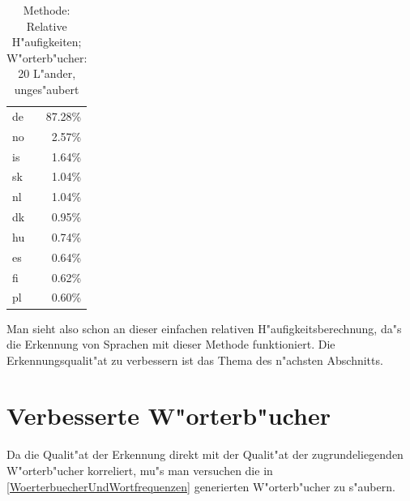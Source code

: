\begin{table}[h]
\begin{center}
\begin{tabular}{|l|r|}
\hline
de    &87.28\%	\\
no    &2.57\% 	\\
is    &1.64\% 	\\
sk    &1.04\% 	\\
nl    &1.04\% 	\\
dk    &0.95\% 	\\
hu    &0.74\% 	\\
es    &0.64\% 	\\
fi    &0.62\% 	\\
pl    &0.60\% 	\\
\hline
\end{tabular}
\end{center}
\caption{Methode: Relative H"aufigkeiten; W"orterb"ucher: 20 L"ander, unges"aubert}
\label{ersteSpracherkennung}
\end{table}

Man sieht also schon an dieser einfachen relativen H"aufigkeitsberechnung, da"s die Erkennung von Sprachen mit dieser Methode funktioniert. Die Erkennungsqualit"at zu verbessern ist das Thema des n"achsten Abschnitts.



\section{Verbesserte W"orterb"ucher}

Da die Qualit"at der Erkennung direkt mit der Qualit"at der zugrundeliegenden W"orterb"ucher korreliert, mu"s man versuchen die in \ref{WoerterbuecherUndWortfrequenzen} generierten W"orterb"ucher zu s"aubern.

